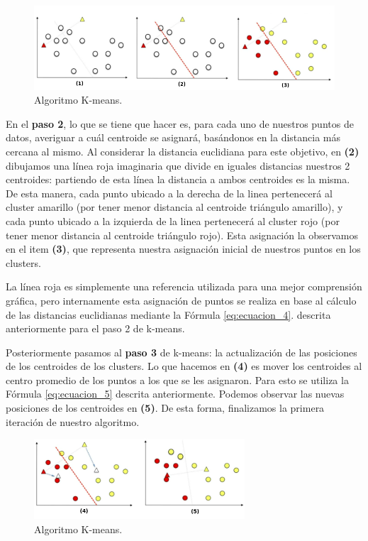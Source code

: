 \documentclass[12pt,a4paper]{article}
\begin{document}
\begin{sloppypar}
\begin{figure}[H]    %
 \centering
 \includegraphics[width=1\textwidth]{images/K_Means_1.png}
 \captionsetup{justification=centering,margin=2cm}
 \caption{Algoritmo K-means.} 
 \label{fig:K_means_working_1}
\end{figure}

En el \textbf{paso 2}, lo que se tiene que hacer es, para cada uno de nuestros puntos de datos, averiguar a cuál centroide se asignará, basándonos en la distancia más cercana al mismo.
Al considerar la distancia euclidiana para este objetivo, en \textbf{(2)} dibujamos una línea roja imaginaria que divide en iguales distancias nuestros 2 centroides: partiendo de esta línea la distancia a ambos centroides es la misma. De esta manera, cada punto ubicado a la derecha de la linea pertenecerá al cluster amarillo (por tener menor distancia al centroide triángulo amarillo), y cada punto ubicado a la izquierda de la linea pertenecerá al cluster rojo (por tener menor distancia al centroide triángulo rojo). Esta asignación la observamos en el item \textbf{(3)}, que representa nuestra asignación inicial de nuestros puntos en los clusters. 

La línea roja es simplemente una referencia utilizada para una mejor comprensión gráfica, pero internamente esta asignación de puntos se realiza en base al cálculo de las distancias euclidianas mediante la Fórmula \ref{eq:ecuacion_4}. descrita anteriormente para el paso 2 de k-means.

Posteriormente pasamos al \textbf{paso 3} de k-means: la actualización de las posiciones de los centroides de los clusters. Lo que hacemos en \textbf{(4)} es mover los centroides al centro promedio de los puntos a los que se les asignaron. Para esto se utiliza la Fórmula \ref{eq:ecuacion_5} descrita anteriormente. Podemos observar las nuevas posiciones de los centroides en \textbf{(5)}. 
De esta forma, finalizamos la primera iteración de nuestro algoritmo. 

\begin{figure}[H]    %
 \centering
 \includegraphics[width=0.7\textwidth]{images/K_Means_2.png}
 \captionsetup{justification=centering,margin=2cm}
 \caption{Algoritmo K-means.}
\end{figure}


\end{sloppypar}
\end{document}

